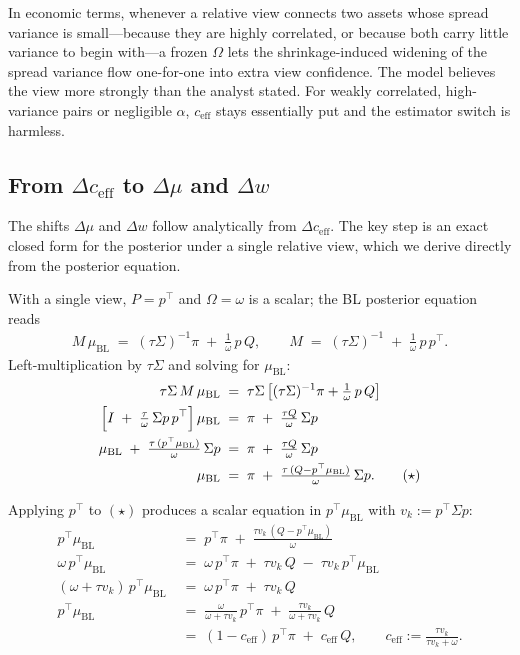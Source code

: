 \documentclass[a4paper,11pt]{article}
\theoremstyle{plain}
\theoremstyle{definition}
\newcommand{\muBL}{\mu_{\mathrm{BL}}}
\newcommand{\eff}{\mathrm{eff}}
\begin{document}
In economic terms, whenever a relative view connects two
assets whose spread variance is small---because they are highly
correlated, or because both carry little variance to begin with---a
frozen $\Omega$ lets the shrinkage-induced widening of the spread
variance flow one-for-one into extra view confidence. The model believes
the view more strongly than the analyst stated. For weakly correlated,
high-variance pairs or negligible $\alpha$, $c_{\eff}$ stays essentially
put and the estimator switch is harmless.

\subsection{From $\Delta c_{\eff}$ to $\Delta\mu$ and $\Delta w$}
\label{sec:dmu-dw}

The shifts $\Delta\mu$ and $\Delta w$ follow analytically from
$\Delta c_{\eff}$. The key step is an exact closed form for the
posterior under a single relative view, which we derive directly from
the posterior equation.

With a single view, $P = p^\top$ and $\Omega = \omega$ is a scalar; the
BL posterior equation reads
\begin{align*}
  M\,\muBL \;=\; (\tau\Sigma)^{-1}\pi \;+\; \tfrac{1}{\omega}\,p\,Q,
  \qquad M \;=\; (\tau\Sigma)^{-1} \;+\; \tfrac{1}{\omega}\,p\,p^\top.
\end{align*}
Left-multiplication by $\tau\Sigma$ and solving for $\muBL$:
\begin{align*}
  \tau\Sigma\,M\,\muBL \;&=\; \tau\Sigma\,\bigl[(\tau\Sigma)^{-1}\pi + \tfrac{1}{\omega}\,p\,Q\bigr]\\
  \Bigl[I \;+\; \tfrac{\tau}{\omega}\,\Sigma p\,p^\top\Bigr]\,\muBL \;&=\; \pi \;+\; \tfrac{\tau Q}{\omega}\,\Sigma p\\
  \muBL \;+\; \tfrac{\tau\,(p^\top\muBL)}{\omega}\,\Sigma p \;&=\; \pi \;+\; \tfrac{\tau Q}{\omega}\,\Sigma p\\
  \muBL \;&=\; \pi \;+\; \tfrac{\tau\,(Q - p^\top\muBL)}{\omega}\,\Sigma p.
  \tag{$\star$}
\end{align*}

Applying $p^\top$ to $(\star)$ produces a scalar equation in
$p^\top\muBL$ with $v_k := p^\top\Sigma p$:
\begin{align*}
  p^\top\muBL \;&=\; p^\top\pi \;+\; \tfrac{\tau v_k\,(Q - p^\top\muBL)}{\omega}\\
  \omega\,p^\top\muBL \;&=\; \omega\,p^\top\pi \;+\; \tau v_k\,Q \;-\; \tau v_k\,p^\top\muBL\\
  (\omega + \tau v_k)\,p^\top\muBL \;&=\; \omega\,p^\top\pi \;+\; \tau v_k\,Q\\
  p^\top\muBL \;&=\; \tfrac{\omega}{\omega + \tau v_k}\,p^\top\pi \;+\; \tfrac{\tau v_k}{\omega + \tau v_k}\,Q\\
  \;&=\; (1 - c_{\eff})\,p^\top\pi \;+\; c_{\eff}\,Q,
  \qquad c_{\eff} := \tfrac{\tau v_k}{\tau v_k + \omega}.
\end{align*}
\end{document}
